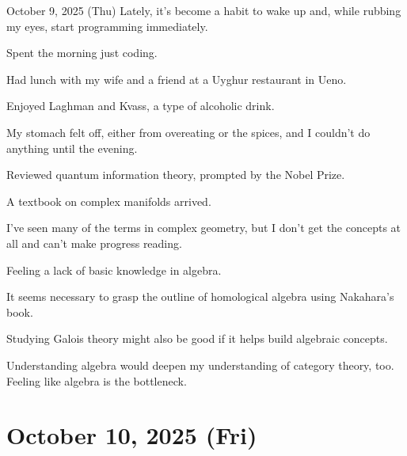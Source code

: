 \documentclass[dvipdfmx, autodetect-engine, aspectratio=169, 10.5pt]{beamer}
\begin{document}
\begin{frame}{October 9, 2025 (Thu)}
\scriptsize
Lately, it's become a habit to wake up and, while rubbing my eyes, start programming immediately.

Spent the morning just coding.

Had lunch with my wife and a friend at a Uyghur restaurant in Ueno.

Enjoyed Laghman and Kvass, a type of alcoholic drink.

My stomach felt off, either from overeating or the spices, and I couldn't do anything until the evening.

Reviewed quantum information theory, prompted by the Nobel Prize.

A textbook on complex manifolds arrived.

I've seen many of the terms in complex geometry, but I don't get the concepts at all and can't make progress reading.

Feeling a lack of basic knowledge in algebra.

It seems necessary to grasp the outline of homological algebra using Nakahara's book.

Studying Galois theory might also be good if it helps build algebraic concepts.

Understanding algebra would deepen my understanding of category theory, too. Feeling like algebra is the bottleneck.
\end{frame}

\section{October 10, 2025 (Fri)}
\end{document}
